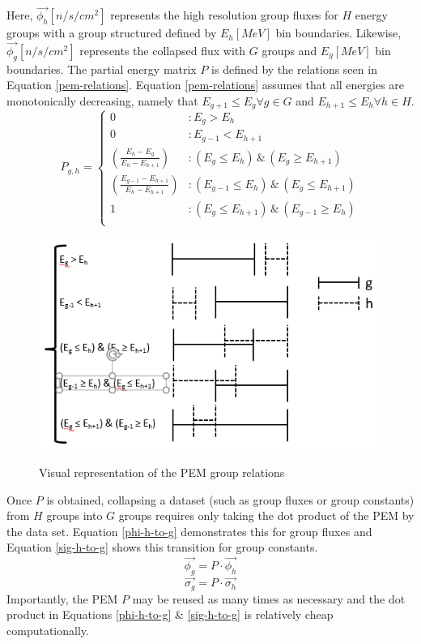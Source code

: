 \documentclass{article}
\begin{document}
Here, $\vec{\phi_h}[n/s/cm^2]$ represents the high resolution group fluxes for $H$ energy groups with
a group structured defined by $E_h[MeV]$ bin boundaries. Likewise, $\vec{\phi_g}[n/s/cm^2]$ represents
the collapsed flux with $G$ groups and $E_g[MeV]$ bin boundaries. The partial energy
matrix $P$ is defined by the relations seen in Equation \ref{pem-relations}.
Equation \ref{pem-relations} assumes that all energies are monotonically decreasing, namely
that $E_{g+1} \le E_{g} \forall g\in G$ and $E_{h+1} \le E_{h} \forall h\in H$.
\begin{equation}
\label{pem-relations}
P_{g,h} = \left\{
\begin{array}{ll}
    0 & : E_{g} > E_{h} \\
    0 & : E_{g-1} < E_{h+1} \\
    \left(\frac{E_h - E_g}{E_h - E_{h+1}}\right) & : (E_{g} \le E_h) \, \& \, (E_{g} \ge E_{h+1}) \\
    \left(\frac{E_{g-1} - E_{h+1}}{E_h - E_{h+1}}\right) & : (E_{g-1} \le E_h) \, \& \, (E_{g} \le E_{h+1}) \\
    1 & : (E_{g} \le E_{h+1}) \, \& \, (E_{g-1} \ge E_{h}) \\
\end{array}
\right.
\end{equation}

\begin{figure}
\caption{Visual representation of the PEM group relations}
\includegraphics[scale=0.8]{bin_graphic.png}
\label{fig:bin_graph}
\end{figure}
Once $P$ is obtained, collapsing a dataset (such as group fluxes or group constants) from $H$
groups into $G$ groups requires only taking the dot product of the PEM
by the data set. Equation \ref{phi-h-to-g} demonstrates this for group fluxes and Equation
\ref{sig-h-to-g} shows this transition for group constants.
\begin{equation}
\label{phi-h-to-g}
\vec{\phi_g} = P \cdot \vec{\phi_h}
\end{equation}
\begin{equation}
\label{sig-h-to-g}
\vec{\sigma_g} = P \cdot \vec{\sigma_h}
\end{equation}
Importantly, the PEM $P$ may be reused as many times as necessary and the dot product in
Equations \ref{phi-h-to-g} \& \ref{sig-h-to-g} is relatively cheap computationally.
\end{document}
